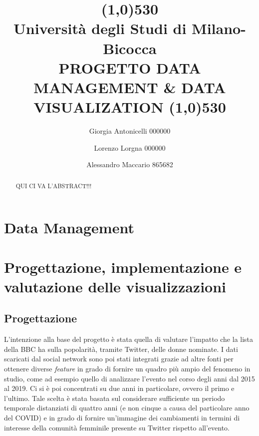 \documentclass[11pt, a4paper]{report}
\title{\line(1,0){530}\\ \vspace{10px} Università degli Studi di Milano-Bicocca \\
	PROGETTO DATA MANAGEMENT \& DATA VISUALIZATION \line(1,0){530}\\ \vspace{-5px}}
\author[*]{Giorgia Antonicelli 000000}
\author[*]{Lorenzo Lorgna 000000}
\author[*]{Alessandro Maccario 865682}
\date{} %
\affil[*]{CdLM Data Science, Università degli Studi di Milano Bicocca}
\begin{document}
\maketitle
	
	
\tableofcontents
	
	
	
\newpage

	
\begin{tcolorbox}[colframe=blue!75!black]
	\begin{abstract}
		QUI CI VA L'ABSTRACT!!!
	\end{abstract}
\end{tcolorbox}
	
	
	\vspace{15px}
	
	
	\chapter{Data Management}
	
	\chapter[Data Visualization]{Progettazione, implementazione e valutazione delle visualizzazioni}
	
	\section{Progettazione}
	
	L'intenzione alla base del progetto è stata quella di valutare l'impatto che la lista della BBC ha sulla popolarità, tramite Twitter, delle donne nominate. I dati scaricati dal social network sono poi stati integrati grazie ad altre fonti per ottenere diverse \textit{feature} in grado di fornire un quadro più ampio del fenomeno in studio, come ad esempio quello di analizzare l'evento nel corso degli anni dal 2015 al 2019. Ci si è poi concentrati su due anni in particolare, ovvero il primo e l'ultimo. Tale scelta è stata basata sul considerare sufficiente un periodo temporale distanziati di quattro anni (e non cinque a causa del particolare anno del COVID) e in grado di fornire un'immagine dei cambiamenti in termini di interesse della comunità femminile presente su Twitter rispetto all'evento. \\
	
\end{document}
